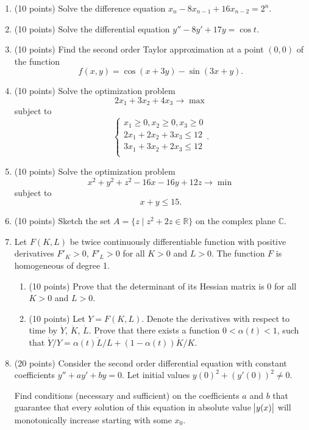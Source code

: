 \begin{enumerate}
  \item (10 points) Solve the difference equation $x_n - 8 x_{n-1} + 16 x_{n-2} = 2^n$.

  \item (10 points) Solve the differential equation $y'' - 8 y' + 17 y = \cos t$.
\item (10 points) 
Find the second order Taylor approximation at a point $(0, 0)$ of the function 
\[
  f(x, y) = \cos(x + 3y) - \sin (3x + y).
\]

\item (10 points) Solve the optimization problem 
\[
2 x_1 + 3 x_2 + 4 x_3 \to \max  
\]
subject to
\[
\begin{cases}
x_1 \geq 0,  x_2 \geq 0, x_3 \geq 0  \\
2 x_1 + 2 x_2 + 3x_3 \leq 12 \\
3 x_1 + 3 x_2 + 2x_3 \leq 12 \\ 
\end{cases}.
\]

\item (10 points) Solve the optimization problem 
\[
x^2 + y^2 + z^2 - 16x - 16y + 12 z \to \min
\]
subject to
\[
x + y \leq 15. 
\]

\item (10 points) Sketch the set $A = \{z \mid z^2 + 2z \in \mathbb R\}$ on the complex plane $\mathbb C$.

\item Let $F(K, L)$ be twice continuously differentiable function with positive derivatives $F'_K >0$, $F'_L > 0$ for all $K > 0$ and $L > 0$. 
The function $F$ is homogeneous of degree 1.
\begin{enumerate}
    \item (10 points) Prove that the determinant of its Hessian matrix is 0 for all $K > 0$ and $L > 0$.
    \item (10 points) Let $Y = F(K, L)$. Denote the derivatives with respect to time by $\dot Y$, $\dot K$, $\dot L$. 
    Prove that there exists a function $0 < \alpha(t) < 1$, such that 
    $\dot Y/Y = \alpha(t) \dot L/L + (1-\alpha(t)) \dot K/K$.
\end{enumerate}


\item (20 points) Consider the second order differential equation with constant coefficients $y'' + a y' + by = 0$. 
Let initial values $y(0)^2 + (y'(0))^2 \neq 0$. 

Find conditions (necessary and sufficient) on the coefficients $a$ and $b$ 
that guarantee that every solution of this equation in absolute value $\abs{y(x)}$ 
will monotonically increase starting with some $x_0$.


\end{enumerate}
